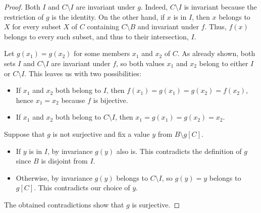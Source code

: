 \begin{proof}
   Both \( I \) and \( C \setminus I \) are invariant under \( g \). Indeed, \( C \setminus I \) is invariant because the restriction of \( g \) is the identity. On the other hand, if \( x \) is in \( I \), then \( x \) belongs to \( X \) for every subset \( X \) of \( C \) containing \( C \setminus B \) and invariant under \( f \). Thus, \( f(x) \) belongs to every such subset, and thus to their intersection, \( I \).

   Let \( g(x_1) = g(x_2) \) for some members \( x_1 \) and \( x_2 \) of \( C \). As already shown, both sets \( I \) and \( C \setminus I \) are invariant under \( f \), so both values \( x_1 \) and \( x_2 \) belong to either \( I \) or \( C \setminus I \). This leaves us with two possibilities:
  \begin{itemize}
    \item If \( x_1 \) and \( x_2 \) both belong to \( I \), then \( f(x_1) = g(x_1) = g(x_2) = f(x_2) \), hence \( x_1 = x_2 \) because \( f \) is bijective.

    \item If \( x_1 \) and \( x_2 \) both belong to \( C \setminus I \), then \( x_1 = g(x_1) = g(x_2) = x_2 \).
  \end{itemize}

   Suppose that \( g \) is not surjective and fix a value \( y \) from \(B \setminus g[C] \).

  \begin{itemize}
    \item If \( y \) is in \( I \), by invariance \( g(y) \) also is. This contradicts the definition of \( g \) since \( B \) is disjoint from \( I \).

    \item Otherwise, by invariance \( g(y) \) belongs to \( C \setminus I \), so \( g(y) = y \) belongs to \( g[C] \). This contradicts our choice of \( y \).
  \end{itemize}

  The obtained contradictions show that \( g \) is surjective.
\end{proof}


